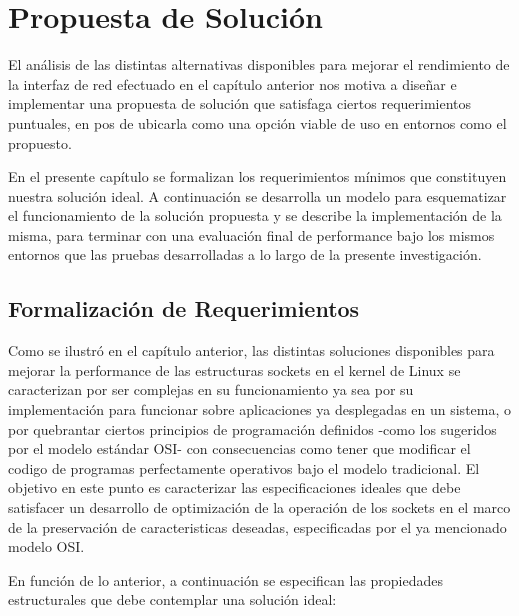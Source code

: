 \chapter{Propuesta de Solución}
El análisis de las distintas alternativas disponibles para mejorar el rendimiento de la interfaz de red efectuado en el capítulo anterior nos motiva a diseñar e implementar una propuesta de solución que satisfaga ciertos requerimientos puntuales, en pos de ubicarla como una opción viable de uso en entornos como el propuesto.

En el presente capítulo se formalizan los requerimientos mínimos que constituyen nuestra solución ideal. A continuación se desarrolla un modelo para esquematizar el funcionamiento de la solución propuesta y se describe la implementación de la misma, para terminar con una evaluación final de performance bajo los mismos entornos que las pruebas desarrolladas a lo largo de la presente investigación.

\section{Formalización de Requerimientos}
Como se ilustró en el capítulo anterior, las distintas soluciones disponibles para mejorar la performance de las estructuras sockets en el kernel de Linux se caracterizan por ser complejas en su funcionamiento ya sea por su implementación para funcionar sobre aplicaciones ya desplegadas en un sistema, o por quebrantar ciertos principios de programación definidos -como los sugeridos por el modelo estándar OSI- con consecuencias como tener que modificar el codigo de programas perfectamente operativos bajo el modelo tradicional. El objetivo en este punto es caracterizar las especificaciones ideales que debe satisfacer un desarrollo de optimización de la operación de los sockets en el marco de la preservación de caracteristicas deseadas, especificadas por el ya mencionado modelo OSI.

En función de lo anterior, a continuación se especifican las propiedades estructurales que debe contemplar una solución ideal:


